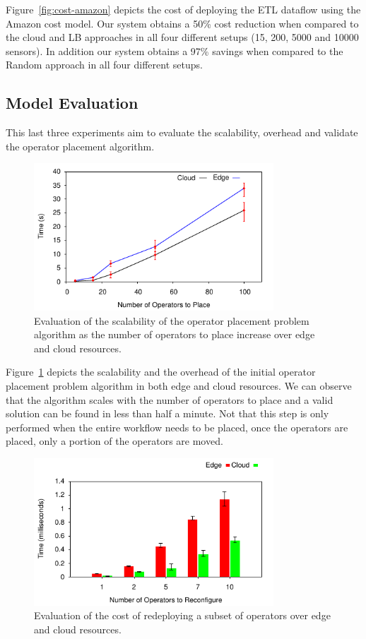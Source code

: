 Figure~\ref{fig:cost-amazon} depicts the cost of deploying the ETL dataflow using the Amazon cost model. Our system obtains a 50\% cost reduction when compared to the cloud and LB approaches in all four different setups (15, 200, 5000 and 10000 sensors). In addition our system obtains a 97\% savings when compared to the Random approach in all four different setups.

\subsection{Model Evaluation}

This last three experiments aim to evaluate the scalability, overhead and validate the operator placement algorithm.

\begin{figure}[h]
  \centering
  \includegraphics[width=0.8\textwidth]{Results/Scale.pdf}
  \caption{Evaluation of the scalability of the operator placement problem algorithm as the number of operators to place increase over edge and cloud resources.}\label{fig:scalefirst}
\end{figure}

Figure~\ref{fig:scalefirst} depicts the scalability and the overhead of the initial operator placement problem algorithm in both edge and cloud resources. We can observe that the algorithm scales with the number of operators to place and a valid solution can be found in less than half a minute. Not that this step is only performed when the entire workflow needs to be placed, once the operators are placed, only a portion of the operators are moved.

\begin{figure}[h]
  \centering
  \includegraphics[width=0.8\textwidth]{Results/Redeploy.pdf}
  \caption{Evaluation of the cost of redeploying a subset of operators over edge and cloud resources.}\label{fig:scalesecond}
\end{figure}

